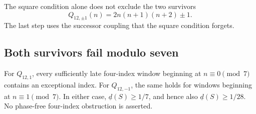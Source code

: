 The square condition alone does not exclude the two survivors
\begin{equation}\label{long243:eq:survivors}
 Q_{12,\pm1}(n)=2n(n+1)(n+2)\pm1 .
\end{equation}
The last step uses the successor coupling that the square condition forgets.

\subsection{Both survivors fail modulo seven}\label{long243:sec:modseven}

\begin{lemma}\label{long243:res:modseven}
For $Q_{12,1}$, every sufficiently late four-index window beginning at
$n\equiv0\pmod7$ contains an exceptional index. For $Q_{12,-1}$, the same
holds for windows beginning at $n\equiv1\pmod7$. In either case,
$\underline d(S)\ge1/7$, and hence also $\underline d(S)\ge1/28$.
No phase-free four-index obstruction is asserted.
\end{lemma}

